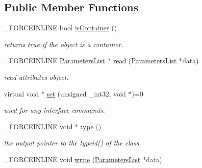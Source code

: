 \subsection*{Public Member Functions}
\begin{DoxyCompactItemize}
\item 
\hypertarget{classcsad_1_1_base_object_ada59b9a0425d74cea61c1f277b580130}{\-\_\-\-F\-O\-R\-C\-E\-I\-N\-L\-I\-N\-E bool \hyperlink{classcsad_1_1_base_object_ada59b9a0425d74cea61c1f277b580130}{is\-Container} ()}\label{classcsad_1_1_base_object_ada59b9a0425d74cea61c1f277b580130}

\begin{DoxyCompactList}\small\item\em returns true if the object is a container. \end{DoxyCompactList}\item 
\hypertarget{classcsad_1_1_base_object_addc5ee69c7bb96a4a654cadecb3e547d}{\-\_\-\-F\-O\-R\-C\-E\-I\-N\-L\-I\-N\-E \hyperlink{classbt_1_1_parameters_list}{Parameters\-List} $\ast$ \hyperlink{classcsad_1_1_base_object_addc5ee69c7bb96a4a654cadecb3e547d}{read} (\hyperlink{classbt_1_1_parameters_list}{Parameters\-List} $\ast$data)}\label{classcsad_1_1_base_object_addc5ee69c7bb96a4a654cadecb3e547d}

\begin{DoxyCompactList}\small\item\em read attributes object. \end{DoxyCompactList}\item 
\hypertarget{classcsad_1_1_base_object_aa8d3a855874527b14a5c56f629789b1f}{virtual void $\ast$ \hyperlink{classcsad_1_1_base_object_aa8d3a855874527b14a5c56f629789b1f}{set} (unsigned \-\_\-int32, void $\ast$)=0}\label{classcsad_1_1_base_object_aa8d3a855874527b14a5c56f629789b1f}

\begin{DoxyCompactList}\small\item\em used for any interface commands. \end{DoxyCompactList}\item 
\hypertarget{classcsad_1_1_base_object_a6ae52b3ccd891d23b270fbb837322d1b}{\-\_\-\-F\-O\-R\-C\-E\-I\-N\-L\-I\-N\-E void $\ast$ \hyperlink{classcsad_1_1_base_object_a6ae52b3ccd891d23b270fbb837322d1b}{type} ()}\label{classcsad_1_1_base_object_a6ae52b3ccd891d23b270fbb837322d1b}

\begin{DoxyCompactList}\small\item\em the output pointer to the typeid() of the class. \end{DoxyCompactList}\item 
\hypertarget{classcsad_1_1_base_object_a588a28a35b2aefa0a833405f152d73e4}{\-\_\-\-F\-O\-R\-C\-E\-I\-N\-L\-I\-N\-E void \hyperlink{classcsad_1_1_base_object_a588a28a35b2aefa0a833405f152d73e4}{write} (\hyperlink{classbt_1_1_parameters_list}{Parameters\-List} $\ast$data)}\label{classcsad_1_1_base_object_a588a28a35b2aefa0a833405f152d73e4}


\end{DoxyCompactItemize}
